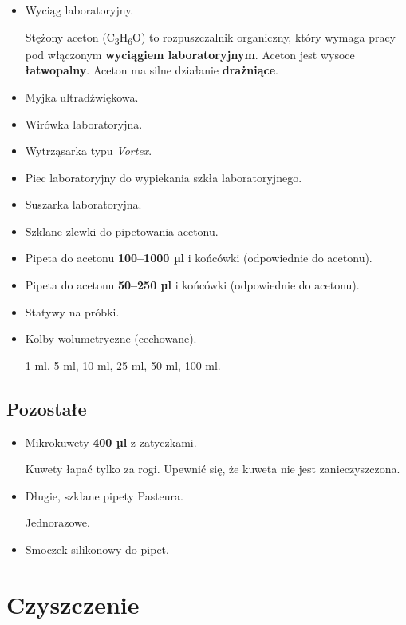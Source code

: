 \documentclass[
  letterpaper,
  DIV=11,
  numbers=noendperiod]{scrreprt}
\begin{document}
\begin{itemize}
\item
  Wyciąg laboratoryjny.

  Stężony aceton (C\textsubscript{3}H\textsubscript{6}O) to
  rozpuszczalnik organiczny, który wymaga pracy pod włączonym
  \textbf{wyciągiem laboratoryjnym}. Aceton jest wysoce
  \textbf{łatwopalny}. Aceton ma silne działanie \textbf{drażniące}.
\item
  Myjka ultradźwiękowa.
\item
  Wirówka laboratoryjna.
\item
  Wytrząsarka typu \emph{Vortex}.
\item
  Piec laboratoryjny do wypiekania szkła laboratoryjnego.
\item
  Suszarka laboratoryjna.
\item
  Szklane zlewki do pipetowania acetonu.
\item
  Pipeta do acetonu \textbf{100--1000 µl} i końcówki (odpowiednie do
  acetonu).
\item
  Pipeta do acetonu \textbf{50--250 µl} i końcówki (odpowiednie do
  acetonu).
\item
  Statywy na próbki.
\item
  Kolby wolumetryczne (cechowane).

  1 ml, 5 ml, 10 ml, 25 ml, 50 ml, 100 ml.
\end{itemize}

\hypertarget{pozostaux142e-2}{%
\subsection{Pozostałe}\label{pozostaux142e-2}}

\begin{itemize}
\item
  Mikrokuwety \textbf{400 µl} z zatyczkami.

  Kuwety łapać tylko za rogi. Upewnić się, że kuweta nie jest
  zanieczyszczona.
\item
  Długie, szklane pipety Pasteura.

  Jednorazowe.
\item
  Smoczek silikonowy do pipet.
\end{itemize}

\hypertarget{czyszczenie-2}{%
\section{Czyszczenie}\label{czyszczenie-2}}
\end{document}
